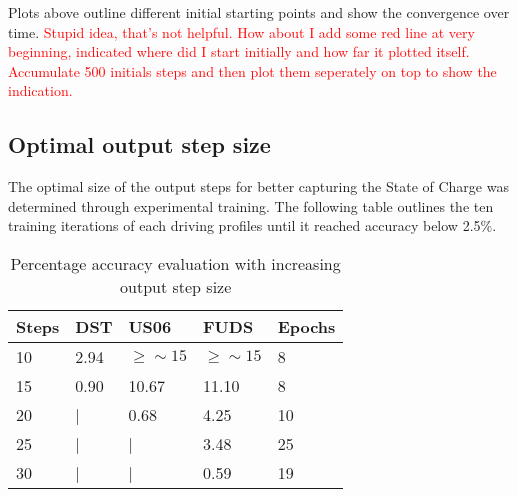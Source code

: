     Plots above outline different initial starting points and show the convergence over time. \textcolor{red}{Stupid idea, that's not helpful. How about I add some red line at very beginning, indicated where did I start initially and how far it plotted itself. Accumulate 500 initials steps and then plot them seperately on top to show the indication.}
\subsection{Optimal output step size}
    The optimal size of the output steps for better capturing the State of Charge was determined through experimental training.
    The following table outlines the ten training iterations of each driving profiles until it reached accuracy below 2.5\%.
    \begin{table}[htbp]
        \centering
        \caption{Percentage accuracy evaluation with increasing output step size}
        \label{tab:out_steps}
        \begin{tabular}{ p{1.5cm} || p{1.5cm} p{1.5cm} p{1.5cm} || p{1.5cm}  }
            \hline
            Steps & DST & US06 & FUDS & Epochs \\
            \hline
            10 & 2.94 & $\geq\sim 15$ & $\geq\sim 15$ & 8 \\
            15 & 0.90 & 10.67  & 11.10  & 8 \\
            20 & |    & 0.68   &  4.25  & 10 \\
            25 & |    & |      &  3.48  & 25 \\
            30 & |    & |      &  0.59  & 19 \\
            \hline
        \end{tabular}
    \end{table}
    

